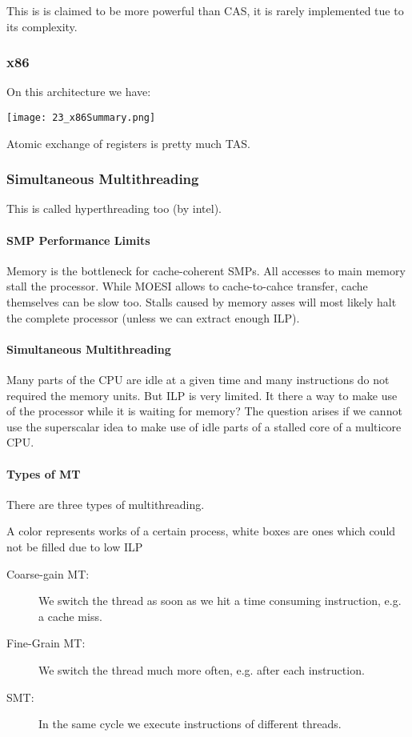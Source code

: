 This is is claimed to be more powerful than CAS, it is rarely implemented tue to its complexity.

\subsubsection{x86}
On this architecture we have:

\texttt{[image: 23\_x86Summary.png]}

Atomic exchange of registers is pretty much TAS.

\subsubsection{Simultaneous Multithreading}
This is called hyperthreading too (by intel).

\paragraph{SMP Performance Limits}
Memory is the bottleneck for cache-coherent SMPs. All accesses to main memory stall the processor. While MOESI allows to cache-to-cahce transfer, cache themselves can be slow too. Stalls caused by memory asses will most likely halt the complete processor (unless we can extract enough ILP).

\paragraph{Simultaneous Multithreading}
Many parts of the CPU are idle at a given time and many instructions do not required the memory units. But ILP is very limited. It there a way to make use of the processor while it is waiting for memory? The question arises if we cannot use the superscalar idea to make use of idle parts of a stalled core of a multicore CPU.

\paragraph{Types of MT}
There are three types of multithreading.

A color represents works of a certain process, white boxes are ones which could not be filled due to low ILP

\begin{description}
    \item[Coarse-gain MT:] We switch the thread as soon as we hit a time consuming instruction, e.g. a cache miss.
    \item[Fine-Grain MT:] We switch the thread much more often, e.g. after each instruction.
    \item[SMT:] In the same cycle we execute instructions of different threads.
\end{description}

